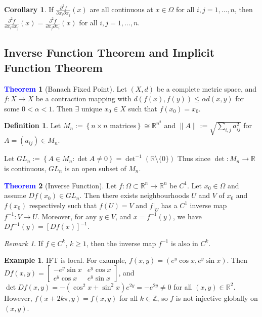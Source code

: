 \documentclass[11pt]{article}
\theoremstyle{definition}
\newtheorem{exmp}{Example}[section]
\theoremstyle{definition}
\newcommand{\R}[0]{\mathbb{R}}
\newcommand{\pdv}[2]{\frac{\partial #1}{\partial #2}}
\newtheorem{theorem}{\textcolor{blue}{Theorem}}
\newtheorem{corollary}{Corollary}
\theoremstyle{definition}
\newtheorem{definition}{\textcolor{OliveGreen}{Definition}}
\theoremstyle{remark}
\newtheorem*{remark}{Remark}
\begin{document}
\begin{corollary}
If $\pdv{^2f}{x_i \partial x_j} (x)$ are all continuous at $x \in \Omega$ for all $i, j = 1, \dots, n$, 
then $\pdv{^2f}{x_i \partial x_j} (x) = \pdv{^2f}{x_j \partial x_i} (x)$ for all $i, j = 1, \dots, n$.  
\end{corollary}

\subsection{Inverse Function Theorem and Implicit Function Theorem}

\begin{theorem}[Banach Fixed Point]
Let $(X, d)$ be a complete metric space, and $f : X \to X$ be a contraction mapping with
$d(f(x), f(y)) \leq \alpha d(x, y)$ for some $0 < \alpha < 1$. Then $\exists$ unique 
$x_0 \in X$ such that $f(x_0) = x_0$.       
\end{theorem}

\begin{definition}
    Let $M_n := \left\{ n \times n \text{ matrices} \right\} \cong \R^{n^2}$ and 
    $\| A \| := \sqrt{\sum_{i,j} a_{ij}^2}$ for $A = (a_{ij}) \in M_n$.

    Let $GL_n := \left\{ A \in M_n : \det A \neq 0 \right\}  = \det ^{-1}(\R \setminus \{0\})$ 
    Thus since $\det : M_n \to \R$ is continuous, $GL_n$ is an open subset of $M_n$.

\end{definition}

\begin{theorem}[Inverse Function]
    Let $f : \Omega \subset \R^n \to \R^n$ be $C^1$. Let $x_0 \in \Omega$ and assume $Df(x_0) 
    \in GL_n$. Then there exists neighbourhoods $U$ and $V$ of $x_0$ and $f(x_0)$ respectively
    such that $f(U) = V$ and $f|_{U}$ has a $C^1$ inverse map $f^{-1} : V \to U$.
    Moreover, for any $y \in V$, and $x = f^{-1}(y)$, we have $Df^{-1}(y) = [Df(x)]^{-1}$.             
\end{theorem}

\begin{remark}
    If $f \in C^k$, $k \geq 1$, then the inverse map $f^{-1}$ is also in $C^k$.  
\end{remark}

\begin{exmp}
    IFT is local. For example, $f(x, y) = (e^y \cos x, e^y \sin x)$. Then 
    $Df(x, y) = \begin{bmatrix}
        -e^y \sin x & e^y \cos x \\
        e^y \cos x & e^y \sin x
    \end{bmatrix}$, and $\det Df(x, y) = -(\cos ^2 x + \sin ^2 x) e^{2y} = -e^{2y} \neq 0$ for all 
    $(x, y) \in \R^2$. However, $f(x + 2k \pi, y) = f(x, y)$ for all $k \in \mathbb{Z}$, so $f$ is not 
    injective globally on $(x, y)$. 
\end{exmp}
\end{document}
